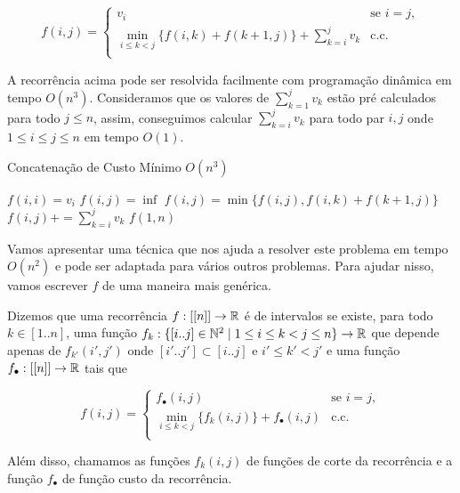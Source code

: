 $$
f(i,j) = \begin{cases}
    v_i & \text{se } i = j, \\
    \min\limits_{i \leq k < j} \Big\{ f(i,k) + f(k+1,j) \Big\} + \sum\limits_{k=i}^j v_k & \text{c.c.} \\
\end{cases}
$$

A recorrência acima pode ser resolvida facilmente com programação dinâmica em tempo $O(n^3)$. Consideramos que os valores de $\sum\limits_{k=1}^j v_k$ estão pré calculados para todo $j \leq n$, assim, conseguimos calcular $\sum\limits_{k=i}^j v_k$ para todo par $i,j$ onde $1 \leq i \leq j \leq n$ em tempo $O(1)$.
\begin{algorithm}[H]
\caption{Concatenação de Custo Mínimo $O(n^3)$}
\label{MinCostConcat}
\begin{algorithmic}[1]
        \State $f(i,i) = v_i$
    \EndFor
            \State $f(i,j) = \inf$
                \State $f(i,j) = \min\{f(i,j), f(i,k)+f(k+1,j)\}$
            \EndFor
            \State $f(i,j) += \sum\limits_{k=i}^j v_k$
        \EndFor
    \EndFor
    \State \Return $f(1,n)$
\EndFunction
\end{algorithmic}
\end{algorithm}

Vamos apresentar uma técnica que nos ajuda a resolver este problema em tempo $O(n^2)$ e pode ser adaptada para vários outros problemas. Para ajudar nisso, vamos escrever $f$ de uma maneira mais genérica. \\

\begin{defi} \label{rec_int}
Dizemos que uma recorrência $f : [[n]] \to \mathbb{R}$ é de intervalos se existe, para todo $k \in [1..n]$, uma função $f_k : \{[i..j] \in \mathbb{N}^2 \mid 1 \leq i \leq k < j \leq n \} \to \mathbb{R}$ que depende apenas de $f_{k'}(i',j')$ onde $[i'..j'] \subset [i..j]$ e $i' \leq k' < j'$ e uma função $f_\bullet : [[n]] \to \mathbb{R}$ tais que

$$
f(i,j) = \begin{cases}
    f_\bullet (i,j) & \text{se } i = j, \\
    \min\limits_{i \leq k < j} \Big\{ f_k(i,j) \Big\} + f_\bullet (i,j) & \text{c.c.} \\
\end{cases}
$$

Além disso, chamamos as funções $f_k(i,j)$ de funções de corte da recorrência e a função $f_\bullet$ de função custo da recorrência.
\end{defi}

